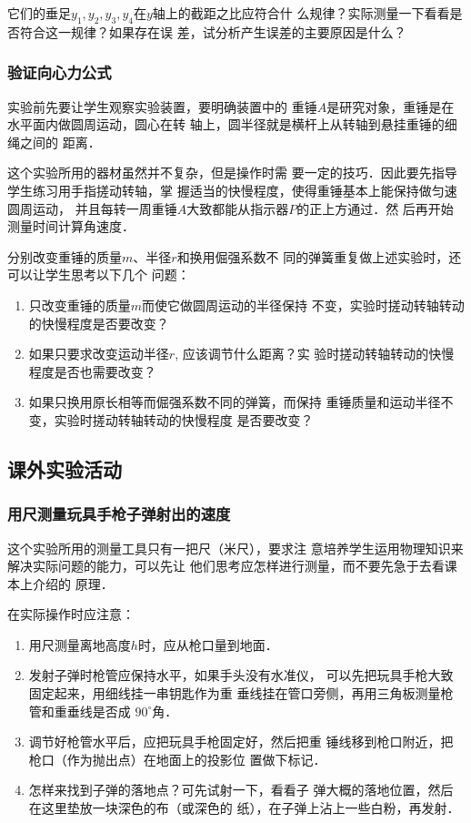 它们的垂足$y_1,y_2,y_3,y_4$在$y$轴上的截距之比应符合什
么规律？实际测量一下看看是否符合这一规律？如果存在误
差，试分析产生误差的主要原因是什么？

\subsubsection{验证向心力公式}
实验前先要让学生观察实验装置，要明确装置中的
重锤$A$是研究对象，重锤是在水平面内做圆周运动，圆心在转
轴上，圆半径就是横杆上从转轴到悬挂重锤的细绳之间的
距离．

这个实验所用的器材虽然并不复杂，但是操作时需
要一定的技巧．因此要先指导学生练习用手指搓动转轴，掌
握适当的快慢程度，使得重锤基本上能保持做匀速圆周运动，
并且每转一周重锤$A$大致都能从指示器$P$的正上方通过．然
后再开始测量时间计算角速度．

分别改变重锤的质量$m$、半径$r$和换用倔强系数不
同的弹簧重复做上述实验时，还可以让学生思考以下几个
问题：
\begin{enumerate}
\item 只改变重锤的质量$m$而使它做圆周运动的半径保持
不变，实验时搓动转轴转动的快慢程度是否要改变？
\item 如果只要求改变运动半径$r$, 应该调节什么距离？实
验时搓动转轴转动的快慢程度是否也需要改变？
\item 如果只换用原长相等而倔强系数不同的弹簧，而保持
重锤质量和运动半径不变，实验时搓动转轴转动的快慢程度
是否要改变？
\end{enumerate}

\subsection{课外实验活动}

\subsubsection{用尺测量玩具手枪子弹射出的速度}

这个实验所用的测量工具只有一把尺（米尺），要求注
意培养学生运用物理知识来解决实际问题的能力，可以先让
他们思考应怎样进行测量，而不要先急于去看课本上介绍的
原理．

在实际操作时应注意：
\begin{enumerate}
\item 用尺测量离地高度$h$时，应从枪口量到地面．
\item 发射子弹时枪管应保持水平，如果手头没有水准仪，
可以先把玩具手枪大致固定起来，用细线挂一串钥匙作为重
垂线挂在管口旁侧，再用三角板测量枪管和重垂线是否成
$90^{\circ}$角．
\item 调节好枪管水平后，应把玩具手枪固定好，然后把重
锤线移到枪口附近，把枪口（作为抛出点）在地面上的投影位
置做下标记．
\item 怎样来找到子弹的落地点？可先试射一下，看看子
弹大概的落地位置，然后在这里垫放一块深色的布（或深色的
纸），在子弹上沾上一些白粉，再发射．
\end{enumerate}

